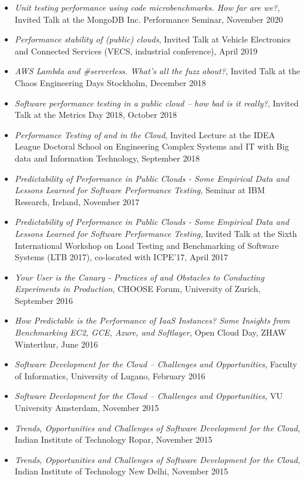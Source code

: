 \documentclass[paper=letter,fontsize=11pt]{scrartcl} %
\begin{document}
\begin{itemize}
  \item \emph{Unit testing performance using code microbenchmarks. How far are we?}, Invited Talk at the MongoDB Inc. Performance Seminar, November 2020
	\item \emph{Performance stability of (public) clouds}, Invited Talk at Vehicle Electronics and Connected Services (VECS, industrial conference), April 2019
	\item \emph{AWS Lambda and \#serverless. What’s all the fuzz about?}, Invited Talk at the Chaos Engineering Days Stockholm, December 2018
		\item \emph{Software performance testing in a public cloud – how bad is it really?}, Invited Talk at the Metrics Day 2018, October 2018
		\item \emph{Performance Testing of and in the Cloud}, Invited Lecture at the IDEA League Doctoral School on Engineering Complex Systems and IT with Big data and Information Technology, September 2018
\item \emph{Predictability of Performance in Public Clouds - Some Empirical Data and Lessons Learned for Software Performance Testing}, Seminar at IBM Research, Ireland, November 2017
\item \emph{Predictability of Performance in Public Clouds - Some Empirical Data and Lessons Learned for Software Performance Testing}, Invited Talk at the Sixth International Workshop on Load Testing and Benchmarking of Software Systems (LTB 2017), co-located with ICPE'17, April 2017
\item \emph{Your User is the Canary - Practices of and Obstacles to Conducting Experiments in Production}, CHOOSE Forum, University of Zurich, September 2016
\item \emph{How Predictable is the Performance of IaaS Instances? Some Insights from Benchmarking EC2, GCE, Azure, and Softlayer}, Open Cloud Day, ZHAW Winterthur, June 2016
\item \emph{Software Development for the Cloud – Challenges and Opportunities}, Faculty of Informatics, University of Lugano, February 2016
\item \emph{Software Development for the Cloud – Challenges and Opportunities}, VU University Amsterdam, November 2015
\item \emph{Trends, Opportunities and Challenges of Software Development for the Cloud}, Indian Institute of Technology Ropar, November 2015
\item \emph{Trends, Opportunities and Challenges of Software Development for the Cloud}, Indian Institute of Technology New Delhi, November 2015

\end{itemize}
\end{document}
